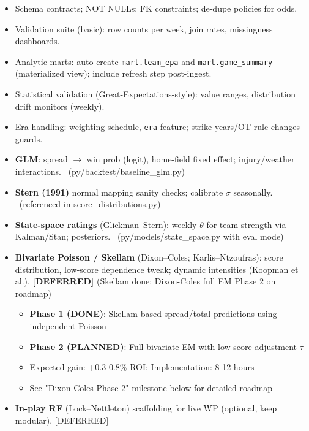\begin{itemize}
  \item {} Schema contracts; NOT NULLs; FK constraints; de-dupe policies for odds.
  \item {} Validation suite (basic): row counts per week, join rates, missingness dashboards.
  \item {} Analytic marts: auto-create \texttt{mart.team\_epa} and \texttt{mart.game\_summary} (materialized view); include refresh step post-ingest. \done
  \item {} Statistical validation (Great-Expectations-style): value ranges, distribution drift monitors (weekly).
  \item {} Era handling: weighting schedule, \texttt{era} feature; strike years/OT rule changes guards.
\end{itemize}

\begin{itemize}
  \item {} \textbf{GLM}: spread $\to$ win prob (logit), home-field fixed effect; injury/weather interactions. \done\ (py/backtest/baseline\_glm.py)
  \item {} \textbf{Stern (1991)} normal mapping sanity checks; calibrate $\sigma$ seasonally. \done\ (referenced in score\_distributions.py)
  \item {} \textbf{State-space ratings} (Glickman--Stern): weekly $\theta$ for team strength via Kalman/Stan; posteriors. \done\ (py/models/state\_space.py with eval mode)
  \item {} \textbf{Bivariate Poisson / Skellam} (Dixon--Coles; Karlis--Ntzoufras): score distribution, low-score dependence tweak; dynamic intensities (Koopman et al.). \textbf{[DEFERRED]} (Skellam done; Dixon-Coles full EM Phase 2 on roadmap)
  \begin{itemize}
    \item \textbf{Phase 1 (DONE)}: Skellam-based spread/total predictions using independent Poisson
    \item \textbf{Phase 2 (PLANNED)}: Full bivariate EM with low-score adjustment $\tau$
    \item Expected gain: +0.3-0.8\% ROI; Implementation: 8-12 hours
    \item See "Dixon-Coles Phase 2" milestone below for detailed roadmap
  \end{itemize}
  \item {} \textbf{In-play RF} (Lock--Nettleton) scaffolding for live WP (optional, keep modular). [DEFERRED]
\end{itemize}

